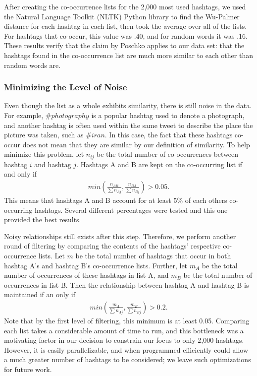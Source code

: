 After creating the co-occurrence lists for the 2,000 most used hashtags, we used the Natural Language Toolkit (NLTK) Python library to find the Wu-Palmer distance for each hashtag in each list, then took the average over all of the lists. For hashtags that co-occur, this value was .40, and for random words it was .16. These results verify that the claim by Poschko applies to our data set: that the hashtags found in the co-occurrence list are much more similar to each other than random words are.
    
\subsubsection{Minimizing the Level of Noise}
Even though the list as a whole exhibits similarity, there is still noise in the data. For example, $\#photography$ is a popular hashtag used to denote a photograph, and another hashtag is often used within the same tweet to describe the place the picture was taken, such as $\#iran$. In this case, the fact that these hashtags co-occur does not mean that they are similar by our definition of similarity. To help minimize this problem, let $n_{ij}$ be the total number of co-occurrences between hashtag $i$ and hashtag $j$. Hashtags A and B are kept on the co-occurring list if and only if
\begin{eqnarray}
min (\frac{n_{AB}}{ \sum n_{Aj}}, \frac{n_{BA}} {\sum n_{Bj}}) > 0.05. \nonumber
\end{eqnarray}
This means that hashtags A and B account for at least 5$\%$ of each others co-occurring hashtags. Several different percentages were tested and this one provided the best results.

Noisy relationships still exists after this step. Therefore, we perform another round of filtering by comparing the contents of the hashtags' respective co-occurrence lists. Let $m$ be the total number of hashtags that occur in both hashtag A's and hashtag B's co-occurrence lists. Further, let $m_A$ be the total number of occurrences of these hashtags in list A, and $m_B$ be the total number of occurrences in list B. Then the relationship between hashtag A and hashtag B is maintained if an only if
\begin{eqnarray}
min (\frac{{m_A} }{\sum n_{Aj}}, \frac{m_B }{ \sum n_{Bj}} ) > 0.2. \nonumber
\end{eqnarray}
Note that by the first level of filtering, this minimum is at least 0.05. Comparing each list takes a considerable amount of time to run, and this bottleneck was a motivating factor in our decision to constrain our focus to only 2,000 hashtags. However, it is easily parallelizable, and when programmed efficiently could allow a much greater number of hashtags to be considered; we leave such optimizations for future work.

